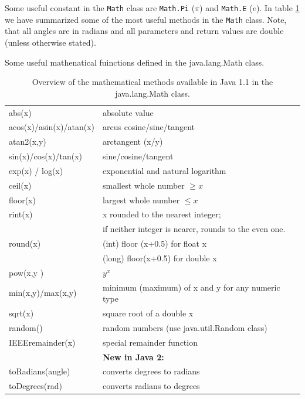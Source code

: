 Some useful constant in the \verb|Math| class  are \verb|Math.Pi|
($\pi$) and \verb|Math.E| ($e$).
In table \ref{tab:math_table} 
we have summarized some of the most useful methods in the \verb|Math| class. 
Note, that all angles are in radians and all parameters and
return values are double (unless otherwise stated). 
\begin{table}[htbp]
\caption{Some useful mathenatical fuinctions defined in the
  java.lang.Math class.}
  \begin{center}
    \leavevmode
    \begin{tabular}{ll}
      abs(x) & absolute value \\
      acos(x)/asin(x)/atan(x) & arcus cosine/sine/tangent \\
      atan2(x,y) & arctangent (x/y)  \\
      sin(x)/cos(x)/tan(x) & sine/cosine/tangent\\
      exp(x) / log(x) & exponential and natural logarithm \\
      ceil(x) & smallest whole number $\ge x$ \\
      floor(x) & largest whole number $\le x$ \\
      rint(x) & x rounded to the nearest integer; \\
             &  if neither integer is
                        nearer, rounds to the even one. \\
      round(x) & (int) floor (x+0.5) for float x \\
       ~       & (long) floor(x+0.5) for double x \\
      pow(x,y ) & $y^x$\\
      min(x,y)/max(x,y)  & minimum (maximum)  of x and y for any numeric type  \\
      sqrt(x) & square root of a double x\\
      random() & random numbers (use java.util.Random class)\\
      IEEEremainder(x) & special remainder function \\\hline
      & \textbf{New in Java 2:} \\
      toRadians(angle) & converts degrees to radians\\
      toDegrees(rad) & converts radians to degrees \
    \end{tabular}
    \caption{Overview of the mathematical methods available in Java 1.1 in the java.lang.Math class.}
    \label{tab:math_table}
  \end{center}
\end{table}

